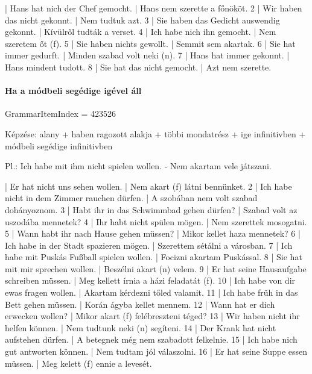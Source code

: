 \documentclass{article}
\newenvironment{desc}{\verbatim}{\endverbatim}
\newenvironment{exmp}{\verbatim}{\endverbatim}
\begin{document}
\begin{exmp}
1 | Hans hat nich der Chef gemocht. | Hans nem szerette a főnököt.
2 | Wir haben das nicht gekonnt. | Nem tudtuk azt.
3 | Sie haben das Gedicht auswendig gekonnt. | Kívülről tudták a verset.
4 | Ich habe nich ihn gemocht. | Nem szeretem őt (f).
5 | Sie haben nichts gewollt. | Semmit sem akartak.
6 | Sie hat immer gedurft. | Minden szabad volt neki (n).
7 | Hans hat immer gekonnt. | Hans mindent tudott.
8 | Sie hat das nicht gemocht. | Azt nem szerette.
\end{exmp}

\paragraph{Ha a módbeli segédige igével áll}

GrammarItemIndex = 423526

\begin{desc}
Képzése:
alany + haben ragozott alakja + többi mondatrész + ige infinitivben + módbeli segédige infinitivben

Pl.: Ich habe mit ihm nicht spielen wollen. - Nem akartam vele játszani.
\end{desc}

\begin{exmp}
1 | Er hat nicht uns sehen wollen. | Nem akart (f) látni bennünket.
2 | Ich habe nicht in dem Zimmer rauchen dürfen. | A szobában nem volt szabad dohányoznom.
3 | Habt ihr in das Schwimmbad gehen dürfen? | Szabad volt az uszodába mennetek?
4 | Ihr habt nicht spülen mögen. | Nem szerettek mosogatni.
5 | Wann habt ihr nach Hause gehen müssen? | Mikor kellet haza mennetek?
6 | Ich habe in der Stadt spazieren mögen. | Szerettem sétálni a városban.
7 | Ich habe mit Puskás Fußball spielen wollen. | Focizni akartam Puskással.
8 | Sie hat mit mir sprechen wollen. | Beszélni akart (n) velem.
9 | Er hat seine Hausaufgabe schreiben müssen. | Meg kellett írnia a házi feladatát (f).
10 | Ich habe von dir ewas fragen wollen. | Akartam kérdezni tőled valamit.
11 | Ich habe früh in das Bett gehen müssen. | Korán ágyba kellet mennem.
12 | Wann hat er dich erwecken wollen? | Mikor akart (f) felébreszteni téged?
13 | Wir haben nicht ihr helfen können. | Nem tudtunk neki (n) segíteni.
14 | Der Krank hat nicht aufstehen dürfen. | A betegnek még nem szabadott felkelnie.
15 | Ich habe nich gut antworten können. | Nem tudtam jól válaszolni.
16 | Er hat seine Suppe essen müssen. | Meg kelett (f) ennie a levesét.
\end{exmp}
\end{document}
